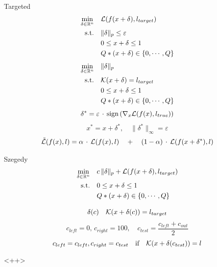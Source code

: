 \documentclass[aspectratio=169, 9pt]{beamer}
\theoremstyle{definition}
\begin{document}
\begin{frame}{Targeted}
  \[
    \begin{aligned}
      \min_{\delta\in\mathbb{R}^n} \quad & \mathcal{L}(f(x+\delta), l_{target})\\
      \mbox{s.t.} \quad &\|\delta\|_p\le \varepsilon \\
      & {0\le x+\delta\le 1}\\
      & {Q*(x+\delta)\in\{0,\cdots,Q\}}
    \end{aligned}
  \]
  \[
    \begin{aligned}
      \min_{\delta\in\mathbb{R}^n} \quad & \|\delta\|_p\\
      \mbox{s.t.} \quad & \mathcal{K}(x+\delta) = l_{target} \\
      & {0\le x+\delta\le 1}\\
      & {Q*(x+\delta)\in\{0,\cdots,Q\}}
    \end{aligned}
  \]
  \[
    \delta^* = \varepsilon \,\cdot\, \mbox{sign}\left(\nabla_x \mathcal{L}(f(x),
    l_{true})\right)
  \]
  \[
    x^* = x+ \delta^*,\quad \|\delta^*\|_\infty=\varepsilon
  \]
  \[
    \tilde {\mathcal{L}}(f(x),l) = \alpha\,\cdot\,\mathcal{L}(f(x),l) 
    \quad+\quad (1-\alpha)\,\cdot\,\mathcal{L}(f( x+\delta^*), l)
  \]
\end{frame}
\begin{frame}{Szegedy}
  \[
    \begin{aligned}
      \min_{\delta\in\mathbb{R}^n} \quad & c\, \|\delta\|_p +
      \mathcal{L}(f(x+\delta),l_{target})\\
      \mbox{s.t.} \quad & {0\le x+\delta\le 1}\\
      & {Q*(x+\delta)\in\{0,\cdots,Q\}}
    \end{aligned}
  \]

  \[
    \delta(c)\quad \mathcal{K}(x+\delta(c)) = l_{target}
  \]
  \[
    c_{left} =0,\, c_{right} = 100,\quad c_{test} = \frac{c_{left} +
    c_{out}}{2}
  \]
  \[
    c_{left} = c_{left}, c_{right} = c_{test}\quad\mbox{if}\quad
    \mathcal{K}(x+\delta(c_{test})) = l
  \]
  
\end{frame}<++>
\end{document}
